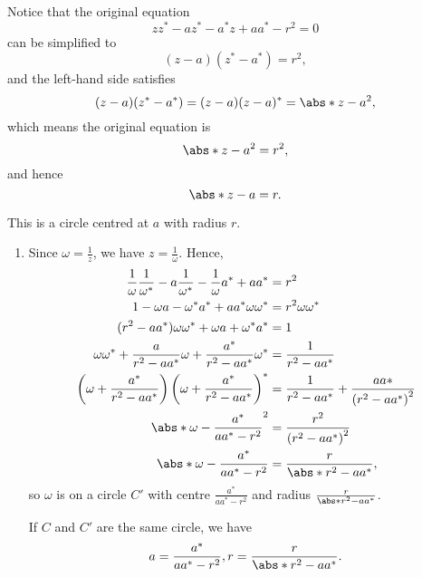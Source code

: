 \Question{\currfilebase}

Notice that the original equation
\[
    z z^* - a z^* - a^* z + a a^* - r^2 = 0
\]
can be simplified to
\[
    (z - a) (z^* - a^*) = r^2,
\]
and the left-hand side satisfies
\[
    (z - a) (z^* - a^*) = (z - a) (z - a)^* = \abs*{z - a}^2,
\]
which means the original equation is
\[
    \abs*{z - a}^2 = r^2,
\]
and hence
\[
    \abs*{z - a} = r.
\]

This is a circle centred at \(a\) with radius \(r\).

\begin{enumerate}
    \item Since \(\omega = \frac{1}{z}\), we have \(z = \frac{1}{\omega}\). Hence,
          \begin{align*}
              \frac{1}{\omega} \frac{1}{\omega^*} - a \frac{1}{\omega^
              *} - \frac{1}{\omega} a^* + a a^*                                                                 & = r^2                                                             \\
              1 - \omega a - \omega^* a^* + a a^* \omega \omega^*                                               & = r^2 \omega \omega^*                                             \\
              (r^2 - a a^*) \omega \omega^* + \omega a + \omega^* a^*                                           & = 1                                                               \\
              \omega \omega^* + \frac{a}{r^2 - a a^*} \omega + \frac{a^*}{r^2 - a a^*} \omega^*                 & = \frac{1}{r^2 - a a^*}                                           \\
              \left(\omega + \frac{a^*}{r^2 - a a^{*}}\right) \left(\omega + \frac{a^*}{r^2 - a a^{*}}\right)^* & = \frac{1}{r^2 - a a^*} + \frac{a a*}{\left(r^2 - a a^*\right)^2} \\
              \abs*{\omega - \frac{a^*}{a a^{*} - r^2}}^2                                                       & = \frac{r^2}{\left(r^2 - a a^*\right)^2}                          \\
              \abs*{\omega - \frac{a^*}{a a^{*} - r^2}}                                                         & = \frac{r}{\abs*{r^2 - a a^*}},
          \end{align*}
          so \(\omega\) is on a circle \(C'\) with centre \(\frac{a^*}{a a^{*} - r^2}\) and radius \(\frac{r}{\abs*{r^2 - a a^*}}\).

          If \(C\) and \(C'\) are the same circle, we have
          \[
              a = \frac{a^*}{a a^{*} - r^2}, r = \frac{r}{\abs*{r^2 - a a^*}}.
          \]


\end{enumerate}
